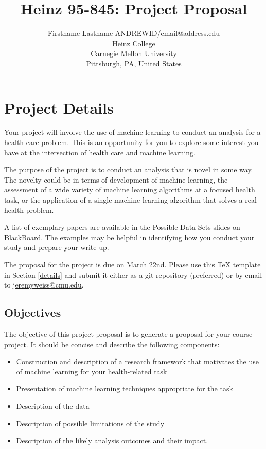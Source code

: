 \documentclass[twoside,11pt]{article}
\begin{document}
\title{Heinz 95-845: Project Proposal}

\author{\name Firstname Lastname \email ANDREWID/email@address.edu \\
       \addr Heinz College\\
       Carnegie Mellon University\\
       Pittsburgh, PA, United States} 

\maketitle


\section{Project Details}
Your project will involve the use of machine learning to conduct an analysis for a health care problem. This is an opportunity for you to explore some interest you have at the intersection of health care and machine learning.

The purpose of the project is to conduct an analysis that is novel in some way. The novelty could be in terms of development of machine learning, the assessment of a wide variety of machine learning algorithms at a focused health task, or the application of a single machine learning algorithm that solves a real health problem.

A list of exemplary papers are available in the Possible Data Sets slides on BlackBoard. The examples may be helpful in identifying how you conduct your study and prepare your write-up.

The proposal for the project is due on March 22nd. Please use this TeX template in Section \ref{details} and submit it either as a git repository (preferred) or by email to \url{jeremyweiss@cmu.edu}.

\subsection{Objectives}
The objective of this project proposal is to generate a proposal for your course project. It should be concise and describe the following components:
\begin{itemize}
\item Construction and description of a research framework that motivates the use of machine learning for your health-related task
\item Presentation of machine learning techniques appropriate for the task
\item Description of the data
\item Description of possible limitations of the study
\item Description of the likely analysis outcomes and their impact.
\end{itemize}
\end{document}
